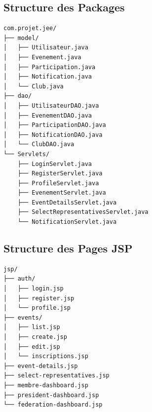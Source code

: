 \documentclass[12pt,a4paper]{article}
\begin{document}
\subsection{Structure des Packages}

\begin{verbatim}
com.projet.jee/
├── model/
│   ├── Utilisateur.java
│   ├── Evenement.java
│   ├── Participation.java
│   ├── Notification.java
│   └── Club.java
├── dao/
│   ├── UtilisateurDAO.java
│   ├── EvenementDAO.java
│   ├── ParticipationDAO.java
│   ├── NotificationDAO.java
│   └── ClubDAO.java
└── Servlets/
    ├── LoginServlet.java
    ├── RegisterServlet.java
    ├── ProfileServlet.java
    ├── EvenementServlet.java
    ├── EventDetailsServlet.java
    ├── SelectRepresentativesServlet.java
    └── NotificationServlet.java
\end{verbatim}

\subsection{Structure des Pages JSP}

\begin{verbatim}
jsp/
├── auth/
│   ├── login.jsp
│   ├── register.jsp
│   └── profile.jsp
├── events/
│   ├── list.jsp
│   ├── create.jsp
│   ├── edit.jsp
│   └── inscriptions.jsp
├── event-details.jsp
├── select-representatives.jsp
├── membre-dashboard.jsp
├── president-dashboard.jsp
└── federation-dashboard.jsp
\end{verbatim}
\end{document}

